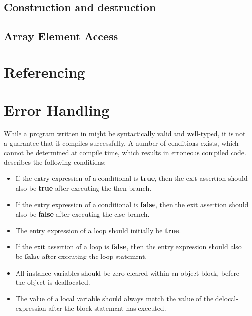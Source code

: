 \subsection{Construction and destruction}
\label{subsec:construction-destruction}

\subsection{Array Element Access}
\label{subsec:array-element-access}

\section{Referencing}
\label{sec:referencing-compilation}

\section{Error Handling}
\label{sec:error-handling}

While a program written in \rooplpp might be syntactically valid and well-typed, it is not a guarantee that it compiles successfully. A number of conditions exists, which cannot be determined at compile time, which results in erroneous compiled code. \citeauthor{th:roopl} describes the following conditions:

\begin{itemize}
    \item If the entry expression of a conditional is \textbf{true}, then the exit assertion should also be \textbf{true} after executing the then-branch.
    \item If the entry expression of a conditional is \textbf{false}, then the exit assertion should also be \textbf{false} after executing the else-branch.
    \item The entry expression of a loop should initially be \textbf{true}.
    \item If the exit assertion of a loop is \textbf{false}, then the entry expression should also be \textbf{false} after executing the loop-statement.
    \item All instance variables should be zero-cleared within an object block, before the object is deallocated.
    \item The value of a local variable should always match the value of the delocal-expression after the block statement has executed.
\end{itemize}


